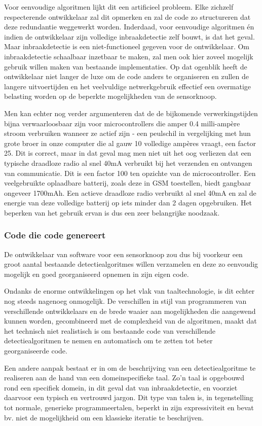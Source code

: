 \documentclass[DIV=calc,paper=a4,fontsize=11pt,twocolumn,draft]{scrartcl}
\newcommand{\heading}[1]{
\subsubsection*{#1}
\vspace{-2mm}
}
\begin{document}
Voor eenvoudige algoritmen lijkt dit een artificieel probleem. Elke zichzelf
respecterende ontwikkelaar zal dit opmerken en zal de code zo structureren dat
deze redundantie weggewerkt worden. Inderdaad, voor eenvoudige algoritmen \'en
indien de ontwikkelaar zijn volledige inbraakdetectie zelf bouwt, is dat het
geval. Maar inbraakdetectie is een niet-functioneel gegeven voor de
ontwikkelaar. Om inbraakdetectie schaalbaar inzetbaar te maken, zal men ook
hier zoveel mogelijk gebruik willen maken van bestaande implementaties. Op dat
ogenblik heeft de ontwikkelaar niet langer de luxe om de code anders te
organiseren en zullen de langere uitvoertijden en het veelvuldige
netwerkgebruik effectief een overmatige belasting worden op de beperkte
mogelijkheden van de sensorknoop.

Men kan echter nog verder argumenteren dat de de bijkomende verwerkingstijden
bijna verwaarloosbaar zijn voor microcontrollers die amper 0.4 milli-amp\`ere
stroom verbruiken wanneer ze actief zijn - een peulschil in vergelijking met
hun grote broer in onze computer die al gauw 10 volledige amp\`eres vraagt, een
factor 25. Dit is correct, maar in dat geval mag men niet uit het oog verliezen
dat een typische draadloze radio al snel 40mA verbruikt bij het verzenden en
ontvangen van communicatie. Dit is een factor 100 ten opzichte van de
microcontroller. Een veelgebruikte oplaadbare batterij, zoals deze in GSM
toestellen, biedt gangbaar ongeveer 1700mAh. Een actieve draadloze radio
verbruikt al snel 40mA en zal de energie van deze volledige batterij op iets
minder dan 2 dagen opgebruiken. Het beperken van het gebruik ervan is dus een
zeer belangrijke noodzaak.

\heading{Code die code genereert}

De ontwikkelaar van software voor een sensorknoop zou dus bij voorkeur een
groot aantal bestaande detectiealgoritmes willen verzamelen en deze zo
eenvoudig mogelijk en goed georganiseerd opnemen in zijn eigen code.

Ondanks de enorme ontwikkelingen op het vlak van taaltechnologie, is dit echter
nog steeds nagenoeg onmogelijk. De verschillen in stijl van programmeren van
verschillende ontwikkelaars en de brede waaier aan mogelijkheden die aangewend
kunnen worden, gecombineerd met de complexheid van de algoritmen, maakt dat het
technisch niet realistisch is om bestaande code van verschillende
detectiealgoritmen te nemen en automatisch om te zetten tot beter
georganiseerde code.

Een andere aanpak bestaat er in om de beschrijving van een detectiealgoritme te
realiseren aan de hand van een domeinspecifieke taal. Zo'n taal is opgebouwd
rond een specifiek domein, in dit geval dat van inbraakdetectie, en voorziet
daarvoor een typisch en vertrouwd jargon. Dit type van talen is, in
tegenstelling tot normale, generieke programmeertalen, beperkt in zijn
expressiviteit en bevat bv. niet de mogelijkheid om een klassieke iteratie te
beschrijven.
\end{document}
